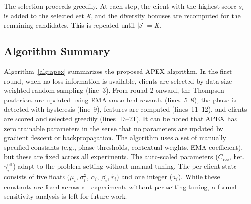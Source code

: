 \documentclass[journal]{IEEEtran}
\begin{document}
The selection proceeds greedily. At each step, the client with the highest score $s_i$ is added to the selected set $\mathcal{S}$, and the diversity bonuses are recomputed for the remaining candidates. This is repeated until $|\mathcal{S}| = K$.

\subsection{Algorithm Summary}

Algorithm~\ref{alg:apex} summarizes the proposed APEX algorithm. In the first round, when no loss information is available, clients are selected by data-size-weighted random sampling (line~3). From round 2 onward, the Thompson posteriors are updated using EMA-smoothed rewards (lines~5--8), the phase is detected with hysteresis (line~9), features are computed (lines~11--12), and clients are scored and selected greedily (lines~13--21). It can be noted that APEX has zero trainable parameters in the sense that no parameters are updated by gradient descent or backpropagation. The algorithm uses a set of manually specified constants (e.g., phase thresholds, contextual weights, EMA coefficient), but these are fixed across all experiments. The auto-scaled parameters ($C_{\text{rec}}$, $\text{het}$, $\gamma_i^{\text{eff}}$) adapt to the problem setting without manual tuning. The per-client state consists of five floats ($\mu_i$, $\sigma^2_i$, $\alpha_i$, $\beta_i$, $\tilde{r}_i$) and one integer ($n_i$). While these constants are fixed across all experiments without per-setting tuning, a formal sensitivity analysis is left for future work.
\end{document}
